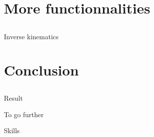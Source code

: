\documentclass[11pt]{beamer}
\begin{document}
\section{More functionnalities}
\subsection*{}
\begin{frame}{Inverse kinematics}
	\begin{center}
	\end{center}
\end{frame}

\section{Conclusion}
\subsection*{}
\begin{frame}{Result}
\end{frame}

\begin{frame}{To go further}
\end{frame}

\begin{frame}{Skills}
\end{frame}
\end{document}
